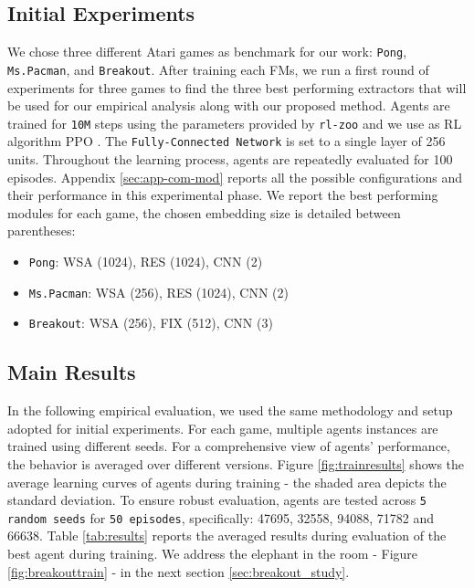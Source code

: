 \subsection{Initial Experiments}\label{sec:init_exp}
We chose three different Atari games as benchmark for our work: \texttt{Pong}, \texttt{Ms.Pacman}, and \texttt{Breakout}. After training each FMs, we run a first round of experiments for three games to find the three best performing extractors that will be used for our empirical analysis along with our proposed method. Agents are trained for \texttt{10M} steps using the parameters provided by \texttt{rl-zoo} and we use as RL algorithm PPO \citep{schulman2017proximal}. The \texttt{Fully-Connected Network} is set to a single layer of 256 units. Throughout the learning process, agents are repeatedly evaluated for 100 episodes. Appendix \ref{sec:app-com-mod} reports all the possible configurations and their performance in this experimental phase. We report the best performing modules for each game, the chosen embedding size is detailed between parentheses:
\begin{itemize}
    \item \texttt{Pong}: WSA (1024), RES (1024), CNN (2)
    \item \texttt{Ms.Pacman}: WSA (256), RES (1024), CNN (2)
    \item \texttt{Breakout}: WSA (256), FIX (512), CNN (3)
\end{itemize}

\subsection{Main Results}\label{sec:results_1}
In the following empirical evaluation, we used the same methodology and setup adopted for initial experiments. For each game, multiple agents instances are trained using different seeds. For a comprehensive view of agents' performance, the behavior is averaged over different versions. Figure \ref{fig:trainresults} shows the average learning curves of agents during training - the shaded area depicts the standard deviation. To ensure robust evaluation, agents are tested across \texttt{5 random seeds} for \texttt{50 episodes}, specifically: 47695, 32558, 94088, 71782 and 66638. Table \ref{tab:results} reports the averaged results during evaluation of the best agent during training. We address the elephant in the room - Figure \ref{fig:breakouttrain} - in the next section \ref{sec:breakout_study}.

